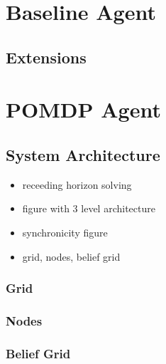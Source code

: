 \section{Baseline Agent}\label{sec:baseline}

\subsection{Extensions}
\section{POMDP Agent}\label{sec:POMDPagent}
\subsection{System Architecture}
\begin{itemize}
    \item receeding horizon solving
    \item figure with 3 level architecture 
    \item synchronicity figure
    \item grid, nodes, belief grid
\end{itemize}
\subsubsection{Grid}
\subsubsection{Nodes}
\subsubsection{Belief Grid}
